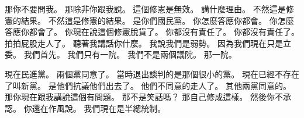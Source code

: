 \hypertarget{w01:cue:2327}{}那你不要問我。
\hypertarget{w01:cue:2328}{}那除非你跟我說。
\hypertarget{w01:cue:2329}{}這個修憲是無效。
\hypertarget{w01:cue:2330}{}講什麼理由。
\hypertarget{w01:cue:2331}{}不然這是修憲的結果。
\hypertarget{w01:cue:2332}{}不然這是修憲的結果。
\hypertarget{w01:cue:2333}{}是你們國民黨。
\hypertarget{w01:cue:2334}{}你怎麼答應你都會。
\hypertarget{w01:cue:2335}{}你怎麼答應你都會了。
\hypertarget{w01:cue:2336}{}你現在說這個修憲脫貨了。
\hypertarget{w01:cue:2337}{}你都沒有責任了。
\hypertarget{w01:cue:2338}{}你都沒有責任了。
\hypertarget{w01:cue:2339}{}拍拍屁股走人了。
\hypertarget{w01:cue:2340}{}聽著我講話你什麼。
\hypertarget{w01:cue:2341}{}我說我們是弱勢。
\hypertarget{w01:cue:2342}{}因為我們現在只是立委。
\hypertarget{w01:cue:2343}{}我們首先。
\hypertarget{w01:cue:2344}{}我們只有一院。
\hypertarget{w01:cue:2345}{}我們不是兩個議院。
\hypertarget{w01:cue:2346}{}那一院。

\hypertarget{w01:cue:2347}{}現在民進黨。
\hypertarget{w01:cue:2348}{}兩個黨同意了。
\hypertarget{w01:cue:2349}{}當時退出談判的是那個很小的黨。
\hypertarget{w01:cue:2350}{}現在已經不存在了叫新黨。
\hypertarget{w01:cue:2351}{}是他們抗議他們出去了。
\hypertarget{w01:cue:2352}{}他們不同意的走人了。
\hypertarget{w01:cue:2353}{}其他兩黨同意的。
\hypertarget{w01:cue:2354}{}那你現在跟我講說這個有問題。
\hypertarget{w01:cue:2355}{}那不是笑話嗎？
\hypertarget{w01:cue:2356}{}那自己修成這樣。
\hypertarget{w01:cue:2357}{}然後你不承認。
\hypertarget{w01:cue:2358}{}你還在作風說。
\hypertarget{w01:cue:2359}{}我們現在是半總統制。

